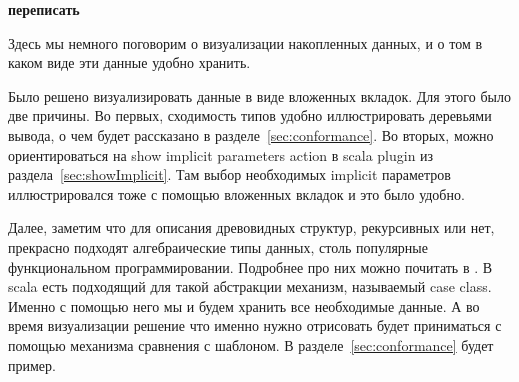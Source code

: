 \textbf{переписать}

Здесь мы немного поговорим о визуализации накопленных данных,
и о том в каком виде эти данные удобно хранить.

Было решено визуализировать данные в виде вложенных вкладок.
Для этого было две причины.
Во первых, сходимость типов удобно иллюстрировать деревьями вывода,
о чем будет рассказано в разделе~\ref{sec:conformance}.
Во вторых, можно ориентироваться на show implicit parameters action
в scala plugin из раздела~\ref{sec:showImplicit}.
Там выбор необходимых implicit параметров иллюстрировался тоже с помощью
вложенных вкладок и это было удобно.

Далее, заметим что для описания древовидных структур, рекурсивных или нет,
прекрасно подходят алгебраические типы данных, столь популярные функциональном
программировании.
Подробнее про них можно почитать в \cite{algebraic_data}.
В scala есть подходящий для такой абстракции механизм, называемый case class.
Именно с помощью него мы и будем хранить все необходимые данные.
А во время визуализации решение что именно нужно отрисовать будет приниматься
с помощью механизма сравнения с шаблоном.
В разделе~\ref{sec:conformance} будет пример.
